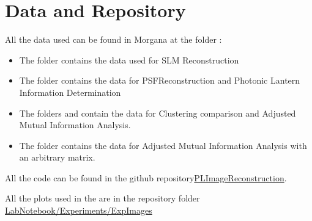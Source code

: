 \section{Data and Repository}

	All the data used can be found in Morgana at the folder \newline {}:
	
	\begin{itemize}
		\item The folder  contains the data used for SLM Reconstruction
		\item The folder  contains the data for PSFReconstruction and Photonic Lantern Information Determination
		\item The folders  and  contain the data for Clustering comparison and Adjusted Mutual Information Analysis.
		\item The folder  contains the data for Adjusted Mutual Information Analysis with an arbitrary matrix.
	\end{itemize}
	
	All the code can be found in the github repository\href{https://github.com/Dacarpe03/PLImageReconstruction}{PLImageReconstruction}.
	
	All the plots used in the  are in the repository folder \href{https://github.com/Dacarpe03/PLImageReconstruction/tree/main/LabNotebook/Experiments/ExpImages}{LabNotebook/Experiments/ExpImages}